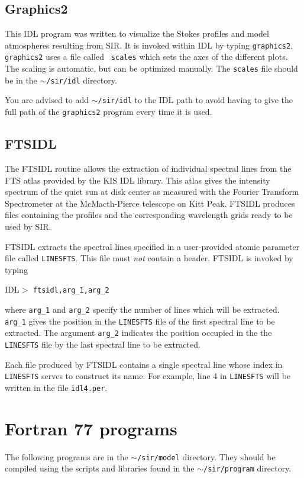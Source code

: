 \subsection{Graphics2}
This IDL program was written to visualize the Stokes profiles and
model atmospheres resulting from SIR. It is invoked within IDL 
by typing {\tt graphics2}. {\tt graphics2} uses a file called {\tt 
scales} which sets the axes of the different plots. The scaling 
is automatic, but can be optimized manually. The {\tt scales} 
file should be in the {\tt $\sim$/sir/idl} directory. 

You are advised to add {\tt $\sim$/sir/idl} to the IDL path to 
avoid having to give the full path of the {\tt graphics2} program 
every time it is used.

\subsection{FTSIDL}
The FTSIDL routine allows the extraction of individual spectral lines from
the FTS atlas provided by the KIS IDL library. This atlas gives the intensity 
spectrum of the quiet sun at disk center as measured with the Fourier 
Transform Spectrometer at the McMacth-Pierce telescope on Kitt Peak. 
FTSIDL produces files containing the profiles and the corresponding 
wavelength grids ready to be used by SIR.

FTSIDL extracts the spectral lines specified in a user-provided atomic parameter
file called {\tt LINESFTS}. This file must {\em not} contain a header. 
FTSIDL is invoked by typing
\begin{flushleft}
IDL$>$ {\tt ftsidl,arg\_1,arg\_2 }
\end{flushleft}
where {\tt arg\_1} and {\tt arg\_2} specify the number of lines which
will be extracted. {\tt arg\_1} gives the position in the {\tt LINESFTS} 
file of the first spectral line to be extracted. The argument
{\tt arg\_2} indicates the position occupied in the
the {\tt LINESFTS} file by the last spectral line to be extracted. 

Each file produced by FTSIDL contains a single spectral line whose index
in {\tt LINESFTS} serves to construct its name. For example,
line 4 in {\tt LINESFTS} will be written in the file {\tt idl4.per}.

\section{Fortran 77 programs} 
The following programs are in the {\tt $\sim$/sir/model} directory.
They should be compiled using the scripts and libraries found in 
the {\tt $\sim$/sir/program} directory.
 

